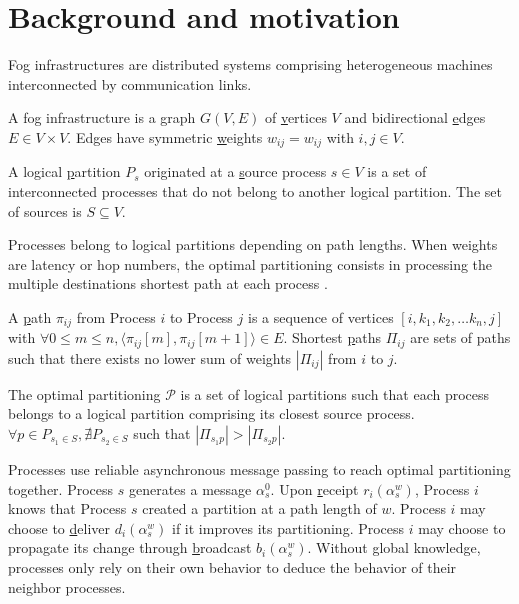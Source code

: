 
\section{Background and motivation}
\label{sec:background}

Fog infrastructures are distributed systems comprising heterogeneous
machines interconnected by communication links.

\begin{definition}
  A fog infrastructure is a \underline{g}raph $G(V, E)$ of
  \underline{v}ertices $V$ and bidirectional \underline{e}dges $E \in
  V \times V$. Edges have symmetric \underline{w}eights $w_{ij} =
  w_{ij}$ with $i, j \in V$.
\end{definition}

\begin{definition}
  A logical \underline{p}artition $P_s$ originated at a
  \underline{s}ource process $s \in V$ is a set of interconnected
  processes that do not belong to another logical partition. The set
  of sources is $S \subseteq V$.
\end{definition}

Processes belong to logical partitions depending on path lengths. When
weights are latency or hop numbers, the optimal partitioning consists
in processing the multiple destinations shortest path at each process
\REF.

\begin{definition}
  A \underline{p}ath $\pi_{ij}$ from Process $i$ to Process $j$ is a
  sequence of vertices $[i, k_1, k_2, \ldots k_n, j]$ with $\forall
  0\leq m \leq n, \langle \pi_{ij}[m], \pi_{ij}[m+1] \rangle \in
  E$. Shortest \underline{p}aths $\Pi_{ij}$ are sets of paths such
  that there exists no lower sum of weights $|\Pi_{ij}|$ from $i$ to
  $j$.
\end{definition}

\begin{definition}
  The optimal partitioning $\mathcal{P}$ is a set of logical
  partitions such that each process belongs to a logical partition
  comprising its closest source process.  $\forall p \in P_{s_1\in S},
  \nexists P_{s_2 \in S}$ such that $|\Pi_{s_1p}| > |\Pi_{s_2p}|$.
\end{definition}

Processes use reliable asynchronous message passing to reach optimal
partitioning together. Process $s$ generates a message
$\alpha_s^0$. Upon \underline{r}eceipt $r_i(\alpha_s^{w})$, Process
$i$ knows that Process $s$ created a partition at a path length of
$w$. Process $i$ may choose to \underline{d}eliver $d_i(\alpha_s^{w})$
if it improves its partitioning. Process $i$ may choose to propagate
its change through \underline{b}roadcast $b_i(\alpha_s^w)$.  Without
global knowledge, processes only rely on their own behavior to deduce
the behavior of their neighbor processes.

